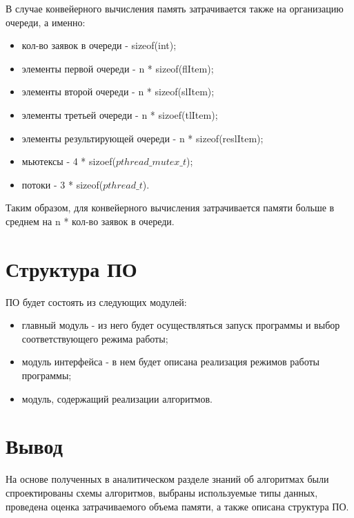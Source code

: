 В случае конвейерного вычисления память затрачивается также на организацию очереди, а именно:
\begin{itemize}
	\item кол-во заявок в очереди - sizeof(int);
	\item элементы первой очереди - n * sizeof(flItem);
	\item элементы второй очереди - n * sizeof(slItem);
	\item элементы третьей очереди - n * sizoef(tlItem);
	\item элементы результирующей очереди - n * sizeof(reslItem);
	\item мьютексы - 4 * sizoef($pthread\_mutex\_t$);
	\item потоки - 3 * sizeof($pthread\_t$).
\end{itemize}

Таким образом, для конвейерного вычисления затрачивается памяти больше в среднем на n * кол-во заявок в очереди.

\section{Структура ПО}

ПО будет состоять из следующих модулей:
\begin{itemize}
	\item главный модуль - из него будет осуществляться запуск программы и выбор соответствующего режима работы;
	\item модуль интерфейса - в нем будет описана реализация режимов работы программы;
	\item модуль, содержащий реализации алгоритмов.
\end{itemize}

\section{Вывод}

На основе полученных в аналитическом разделе знаний об алгоритмах были спроектированы схемы алгоритмов, выбраны используемые типы данных, проведена оценка затрачиваемого объема памяти, а также описана структура ПО.